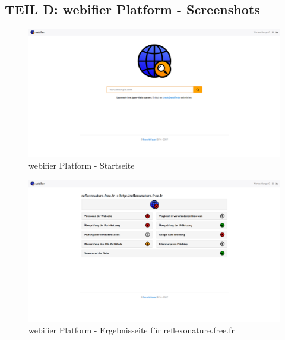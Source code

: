 \begin{landscape}

\section*{TEIL D: webifier Platform - Screenshots}
\label{app:d}

\begin{figure}[H]
  \centering
  \includegraphics[width=\textheight]{images/platform/screenshot-start}
  \caption{webifier Platform - Startseite}
\end{figure}

\begin{figure}[H]
  \centering
  \includegraphics[width=\textheight]{images/platform/screenshot-reflexonature}
  \caption{webifier Platform - Ergebnisseite für reflexonature.free.fr}
  \label{fig:platform-result}
\end{figure}



\end{landscape}
